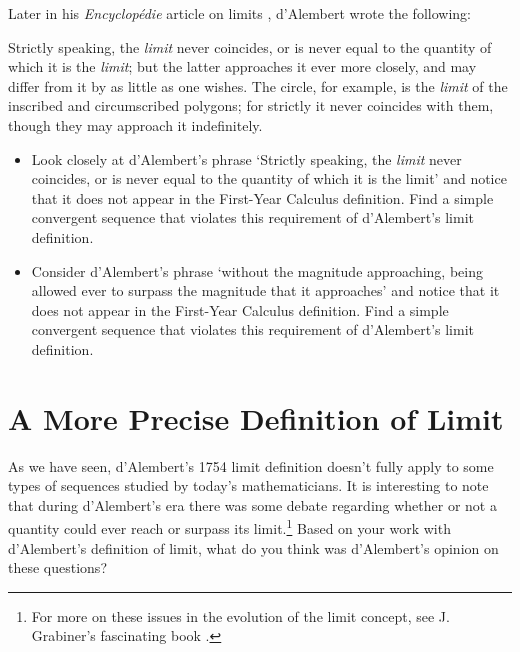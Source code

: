 \documentclass[11pt]{article}%
\newenvironment{source}%
 {  \nopagebreak[4]\begin{quoting}
        \nopagebreak[4]  \begin{sf} \vspace*{0.1in}  }
   {   \end{sf}  \nopagebreak[4]   \end{quoting} \nopagebreak[4] }%
\newcounter{tasknumb}
\newcommand{\tasknumb}[1]{\refstepcounter{tasknumb}\textmd{\textbf{$\fbox{$\fbox{Task \thetasknumb}$}$}}#1}
\newenvironment{task}[1][]%
{\begin{itemize}
\item[\tasknumb{#1}] }
{
\end{itemize} }%
\begin{document}
\medskip
Later in his  \emph{Encyclop\'{e}die} article on limits \citep{DAlembert1754a}, d'Alembert wrote the following:

\begin{source}

Strictly speaking, the \textit{limit} never coincides, or is never equal to
the quantity of which it is the \textit{limit}; but the latter approaches it
ever more closely, and may differ from it by as little as one wishes. The
circle, for example, is the \textit{limit} of the inscribed and circumscribed
polygons; for strictly it never coincides with them, though they may approach
it indefinitely.
\end{source}


\medskip
\begin{task}
Look closely at d'Alembert's phrase `\textsf{Strictly speaking, the
\textit{limit} never coincides, or is never equal to the quantity of which it
is the limit}' and notice that it does not appear in the First-Year Calculus
definition.  Find a simple
convergent sequence that violates this requirement of d'Alembert's limit definition.
\end{task}



\medskip
\begin{task}
Consider d'Alembert's phrase `\textsf{without the magnitude approaching, being
allowed ever to surpass the magnitude that it approaches}' and notice that it
does not appear in the First-Year Calculus definition. Find a simple
convergent sequence that violates this requirement of d'Alembert's limit definition.
\end{task}

\newpage
\vspace*{-40pt}

\section{A More Precise Definition of Limit}

 As we have seen, d'Alembert's 1754 limit definition doesn't fully
apply to some types of sequences studied by today's mathematicians. It is
interesting to note that during d'Alembert's era there was some debate
regarding whether or not a quantity could ever reach or surpass its limit.\footnote{For more on these issues in the evolution of the limit concept, see
J. Grabiner's fascinating book \citep{Grabiner2010}.}  Based on your work with d'Alembert's definition of limit, what do you think was
d'Alembert's opinion on these questions?
\end{document}
